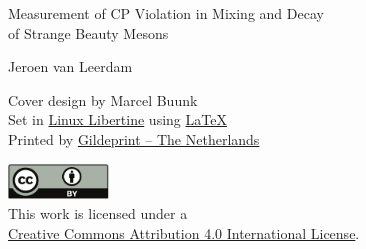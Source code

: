 \thispagestyle{empty}
\begin{center}

  {\Large
  Measurement of CP Violation in Mixing and Decay\\
  of Strange Beauty Mesons}




  {\large
  Jeroen van Leerdam}

\end{center}

\newpage
\thispagestyle{empty}

\begin{center}
  Cover design by Marcel Buunk \\

  Set in \href{http://www.linuxlibertine.org/}{Linux Libertine} using \href{https://latex-project.org/}{\LaTeX} \\
  Printed by \href{http://www.gildeprint.nl/}{Gildeprint -- The Netherlands}\\


  \href{http://creativecommons.org/licenses/by/4.0/}{\includegraphics[width=0.2\textwidth]{graphics/title/cc_by_cmyk}}\\
  This work is licensed under a\\
  \href{http://creativecommons.org/licenses/by/4.0/}{Creative Commons Attribution 4.0 International License}.

\end{center}


